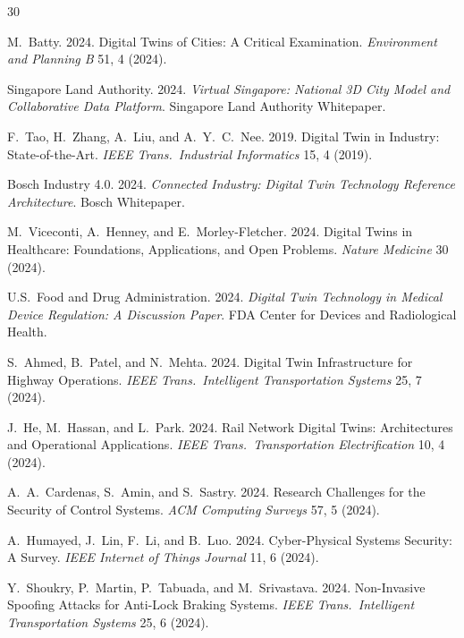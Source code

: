 \documentclass[sigconf,nonacm]{acmart}
\begin{document}
\sloppy

\begin{thebibliography}{30}

M.~Batty. 2024. Digital Twins of Cities: A Critical Examination.
\textit{Environment and Planning B} 51, 4 (2024).

Singapore Land Authority. 2024. \textit{Virtual Singapore: National
3D City Model and Collaborative Data Platform}. Singapore Land
Authority Whitepaper.

F.~Tao, H.~Zhang, A.~Liu, and A.~Y.~C.~Nee. 2019. Digital Twin in
Industry: State-of-the-Art. \textit{IEEE Trans.\ Industrial
Informatics} 15, 4 (2019).

Bosch Industry 4.0. 2024. \textit{Connected Industry: Digital Twin
Technology Reference Architecture}. Bosch Whitepaper.

M.~Viceconti, A.~Henney, and E.~Morley-Fletcher. 2024. Digital
Twins in Healthcare: Foundations, Applications, and Open
Problems. \textit{Nature Medicine} 30 (2024).

U.S.~Food and Drug Administration. 2024. \textit{Digital Twin
Technology in Medical Device Regulation: A Discussion Paper}.
FDA Center for Devices and Radiological Health.

S.~Ahmed, B.~Patel, and N.~Mehta. 2024. Digital Twin Infrastructure
for Highway Operations. \textit{IEEE Trans.\ Intelligent
Transportation Systems} 25, 7 (2024).

J.~He, M.~Hassan, and L.~Park. 2024. Rail Network Digital Twins:
Architectures and Operational Applications.
\textit{IEEE Trans.\ Transportation Electrification} 10, 4 (2024).

A.~A.~Cardenas, S.~Amin, and S.~Sastry. 2024. Research Challenges
for the Security of Control Systems. \textit{ACM Computing
Surveys} 57, 5 (2024).

A.~Humayed, J.~Lin, F.~Li, and B.~Luo. 2024. Cyber-Physical
Systems Security: A Survey. \textit{IEEE Internet of Things
Journal} 11, 6 (2024).

Y.~Shoukry, P.~Martin, P.~Tabuada, and M.~Srivastava. 2024.
Non-Invasive Spoofing Attacks for Anti-Lock Braking Systems.
\textit{IEEE Trans.\ Intelligent Transportation Systems}
25, 6 (2024).


\end{thebibliography}
\end{document}

